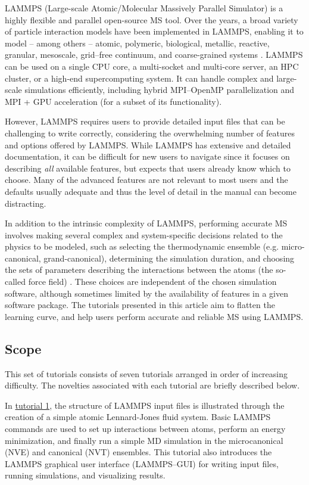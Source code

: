 \documentclass[9pt,tutorial]{livecoms}
\begin{document}
LAMMPS (Large-scale Atomic/Molecular Massively Parallel Simulator)
\cite{lammps_home} is a highly flexible and parallel open-source MS
tool.  Over the years, a broad variety of particle interaction models
have been implemented in LAMMPS, enabling it to model -- among others --
atomic, polymeric, biological, metallic, reactive, granular, mesoscale,
grid--free continuum, and coarse-grained systems
\cite{thompson2022lammps}.  LAMMPS can be used on a single CPU core, a
multi-socket and multi-core server, an HPC cluster, or a high-end
supercomputing system.  It can handle complex and large-scale
simulations efficiently, including hybrid MPI--OpenMP parallelization
and MPI + GPU acceleration (for a subset of its functionality).

However, LAMMPS requires users to provide detailed input files that can
be challenging to write correctly, considering the overwhelming number
of features and options offered by LAMMPS.  While LAMMPS has
extensive and detailed documentation, it can be difficult for new users
to navigate since it focuses on describing \emph{all} available
features, but expects that users already know which to choose.  Many of
the advanced features are not relevant to most users and the defaults
usually adequate and thus the level of detail in the manual can become
distracting.

In addition to the intrinsic complexity of LAMMPS, performing accurate
MS involves making several complex and system-specific decisions related
to the physics to be modeled, such as selecting the thermodynamic
ensemble (e.g. micro-canonical, grand-canonical), determining the
simulation duration, and choosing the sets of parameters describing the
interactions between the atoms (the so-called force field)
\cite{van2018validation}.  These choices are independent of the chosen
simulation software, although sometimes limited by the availability of
features in a given software package.  The tutorials presented in this
article aim to flatten the learning curve, and help users perform
accurate and reliable MS using LAMMPS.

\subsection{Scope}

This set of tutorials consists of seven tutorials arranged in order of
increasing difficulty.  The novelties associated with each tutorial are
briefly described below.

In \hyperref[lennard-jones-label]{tutorial 1}, the structure of LAMMPS
input files is illustrated through the creation of a simple atomic
Lennard-Jones fluid system.  Basic LAMMPS commands are used to set up
interactions between atoms, perform an energy minimization, and finally
run a simple MD simulation in the microcanonical (NVE) and canonical (NVT)
ensembles.  This tutorial also introduces the LAMMPS graphical user
interface (LAMMPS--GUI) for writing input files, running simulations,
and visualizing results.
\end{document}

